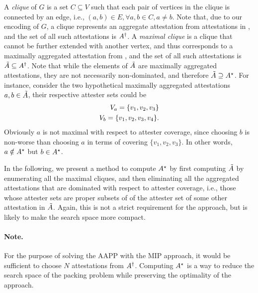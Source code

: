 \documentclass{article}
\begin{document}
A \emph{clique} of $G$ is a set $C \subseteq V$ such that each pair of vertices
in the clique is connected by an edge, i.e., $(a, b) \in E, \forall a, b \in C,
a \neq b$. Note that, due to our encoding of $G$, a clique represents an
aggregate attestation from attestations in \attestations{}, and the set of all
such attestations is $A^{\dagger}$.  A \emph{maximal clique} is a
clique that cannot be further extended with another vertex, and thus
corresponds to a maximally aggregated attestation from \attestations{}, and the
set of all such attestations is $\tilde{A} \subseteq
A^{\dagger}$. Note that while the elements of
$\tilde{A}$ are maximally aggregated attestations, they are not
necessarily non-dominated, and therefore $\tilde{A} \supseteq
A^{\star}$. For instance, consider the two hypothetical maximally
aggregated attestations $a, b \in \tilde{A}$, their respective
attester sets could be 
%
\begin{align}
  V_{a} = \{ v_1, v_2, v_3 \} \\
  V_{b} = \{ v_1, v_2, v_3, v_4 \}.
\end{align}
%
Obviously $a$ is not maximal with respect to attester coverage, since choosing
$b$ is non-worse than choosing $a$ in terms of covering $\{ v_1, v_2, v_3 \}$.
In other words, $a \notin A^{\star}$ but $b \in
A^{\star}$.

In the following, we present a method to compute $A^{\star}$ by
first computing $\tilde{A}$ by enumerating all the maximal cliques,
and then eliminating all the aggregated attestations that are dominated with
respect to attester coverage, i.e., those whose attester sets are proper
subsets of of the attester set of some other attestation in
$\tilde{A}$. Again, this is not a strict requirement for the
approach, but is likely to make the search space more compact.

\paragraph{Note.}For the purpose of solving the AAPP with the MIP approach, it
would be sufficient to choose $N$ attestations from $A^{\dagger}$.
Computing $A^{\star}$ is a way to reduce the search space of the
packing problem while preserving the optimality of the approach.
\vspace{2em}
\end{document}
